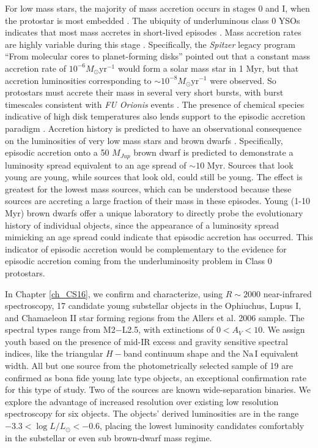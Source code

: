 For low mass stars, the majority of mass accretion occurs in stages 0 and I, when the protostar is most embedded \citep{2007ARA&A..45..565M,2014prpl.conf..195D}.  The ubiquity of underluminous class 0 YSOs indicates that most mass accretes in short-lived episodes \citep{2008ApJS..179..249D}.  Mass accretion rates are highly variable during this stage \citep{2006ApJ...650..956V,2009ApJ...702L..27B,2014prpl.conf..387A}.  Specifically, the \emph{Spitzer} legacy program ``From molecular cores to planet-forming disks'' \citep[][\emph{c2d}]{2009ApJS..181..321E} pointed out that a constant mass accretion rate of $10^{-6} M_{\odot}\mathrm{yr}^{-1}$ would form a solar mass star in 1 Myr, but that accretion luminosities corresponding to $\sim10^{-8} M_{\odot}\mathrm{yr}^{-1}$ were observed.  So protostars must accrete their mass in several very short bursts, with burst timescales consistent with \emph{FU Orionis} events \citep{2014prpl.conf..195D}.  The presence of chemical species indicative of high disk temperatures also lends support to the episodic accretion paradigm \citep{2012ApJ...754L..18V}.  Accretion history is predicted to have an observational consequence on the luminosities of very low mass stars and brown dwarfs \citep{2009ApJ...702L..27B,2011ApJ...730...32S}.  Specifically, episodic accretion onto a 50 $M_{Jup}$ brown dwarf is predicted to demonstrate a luminosity spread equivalent to an age spread of $\sim10$ Myr.  Sources that look young are young, while sources that look old, could still be young.  The effect is greatest for the lowest mass sources, which can be understood because these sources are accreting a large fraction of their mass in these episodes.  Young (1-10 Myr) brown dwarfs offer a unique laboratory to directly probe the evolutionary history of individual objects, since the appearance of a luminosity spread mimicking an age spread could indicate that episodic accretion has occurred.  This indicator of episodic accretion would be complementary to the evidence for episodic accretion coming from the underluminosity problem in Class 0 protostars.


In Chapter \ref{ch_CS16}, we confirm and characterize, using $R\sim 2000$ near-infrared spectroscopy, 17 candidate young substellar objects in the Ophiuchus, Lupus I, and Chamaeleon II star forming regions from the Allers et al. 2006 sample.  The spectral types range from M2$-$L2.5, with extinctions of $0 < A_V < 10$.  We assign youth based on the presence of mid-IR excess and gravity sensitive spectral indices, like the triangular $H-$band continuum shape and the $\mathrm{Na\, I}$ equivalent width.  All but one source from the photometrically selected sample of 19 are confirmed as bona fide young late type objects, an exceptional confirmation rate for this type of study.  Two of the sources are known wide-separation binaries.  We explore the advantage of increased resolution over existing low resolution spectroscopy for six objects.  The objects' derived luminosities are in the range $-3.3 < \log L/L_{\odot} < -0.6$, placing the lowest luminosity candidates comfortably in the substellar or even sub brown-dwarf mass regime.

